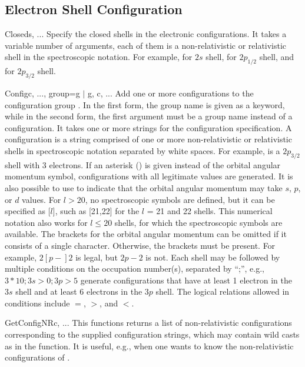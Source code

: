 \subsection{Electron Shell Configuration}

\begin{fundesc}{Closed}{s, ...}
Specify the closed shells in the electronic configurations. It takes a variable
number of arguments, each of them is a non-relativistic or relativistic shell in
the spectroscopic notation. For example,  for $2s$ shell,  for
$2p_{1/2}$ shell, and  for $2p_{3/2}$ shell.
\end{fundesc}

\begin{fundesc}{Config}{c, ..., group=g $\mid$ g, c, ...}
Add one or more configurations to the configuration group . In the first
form, the group name  is given as a keyword, while in the second form,
the first argument must be a group name instead of a configuration. It takes one
or more strings for the configuration specification. A configuration  is
a string comprised of one or more non-relativistic or relativistic shells in
spectroscopic notation separated by white spaces. For example,  is a
$2p_{3/2}$ shell with 3 electrons. If an asterisk (\key{*}) is given instead of
the orbital angular momentum symbol, configurations with all legitimate values
are generated. It is also possible to use \key{[s,p,d]} to indicate that the
orbital angular momentum may take $s$, $p$, or $d$ values. For $l > 20$, no
spectroscopic symbols are defined, but it can be specified as [$l$], such as
[21,22] for the $l$ = 21 and 22 shells. This numerical notation also works for
$l \le 20$ shells, for which the spectroscopic symbols  are available. The brackets for the
orbital angular momentum can be omitted if it consists of a single character.
Otherwise, the brackets must be present. For example, $2[p-]2$  is legal, but
$2p-2$ is not. Each shell may be followed by multiple conditions on the
occupation number(s), separated by ``;'', e.g., $3*10;3s>0;3p>5$ generate
configurations that have at least 1 electron in the $3s$ shell and at least 6
electrons in the $3p$ shell. The logical relations allowed in conditions
include $=$, $>$, and $<$. 
\end{fundesc}

\begin{fundesc}{GetConfigNR}{c, ...}
This functions returns a list of non-relativistic configurations corresponding
to the supplied configuration strings, which may contain wild casts as in the
 function. It is useful, e.g., when one wants to know the
non-relativistic configurations of . 
\end{fundesc}

